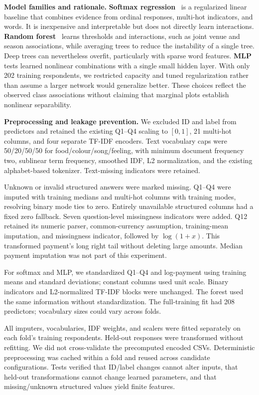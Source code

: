 \documentclass[10pt,letterpaper]{article}
\newcommand{\topic}[1]{\par\smallskip\textbf{#1}\quad}
\begin{document}
\topic{Model families and rationale.}
\textbf{Softmax regression}~\cite{softmax} is a regularized linear baseline that combines evidence
from ordinal responses, multi-hot indicators, and words. It is inexpensive and
interpretable but does not directly learn interactions.
\textbf{Random forest}~\cite{forest} learns thresholds and interactions, such as joint venue and
season associations, while averaging trees to reduce the instability of a single
tree. Deep trees can nevertheless overfit, particularly with sparse word features.
\textbf{MLP}~\cite{mlp} tests learned nonlinear combinations with a single small hidden layer.
With only 202 training respondents, we restricted capacity and tuned regularization
rather than assume a larger network would generalize better. These choices reflect
the observed class associations without claiming that marginal plots establish
nonlinear separability.

\topic{Preprocessing and leakage prevention.}
We excluded ID and label from predictors and retained the existing Q1--Q4 scaling
to $[0,1]$, 21 multi-hot columns, and four separate TF-IDF encoders. Text vocabulary
caps were 50/20/50/50 for food/colour/song/feeling, with minimum document frequency
two, sublinear term frequency, smoothed IDF, L2 normalization, and the existing
alphabet-based tokenizer. Text-missing indicators were retained.

Unknown or invalid structured answers were marked missing. Q1--Q4 were imputed
with training medians and multi-hot columns with training modes, resolving binary
mode ties to zero. Entirely unavailable structured columns had a fixed zero
fallback. Seven question-level missingness indicators were added. Q12 retained
its numeric parser, common-currency assumption, training-mean imputation, and
missingness indicator, followed by $\log(1+x)$. This transformed payment's long
right tail without deleting large amounts. Median payment imputation was not
part of this experiment.

For softmax and MLP, we standardized Q1--Q4 and log-payment using training means
and standard deviations; constant columns used unit scale. Binary indicators and
L2-normalized TF-IDF blocks were unchanged. The forest used the same information
without standardization. The full-training fit had 208 predictors; vocabulary
sizes could vary across folds.

All imputers, vocabularies, IDF weights, and scalers were fitted separately on each
fold's training respondents. Held-out responses were transformed without refitting.
We did not cross-validate the precomputed encoded CSVs. Deterministic preprocessing
was cached within a fold and reused across candidate configurations. Tests verified
that ID/label changes cannot alter inputs, that held-out transformations cannot
change learned parameters, and that missing/unknown structured values yield finite
features.
\end{document}
